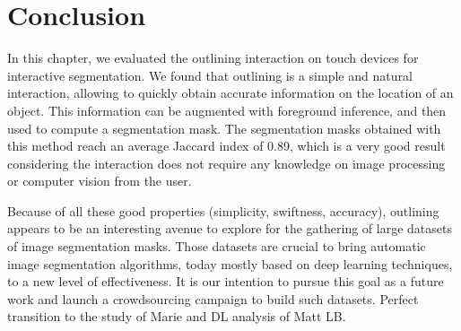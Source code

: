 \section{Conclusion}


In this chapter, we evaluated the outlining interaction
on touch devices for interactive segmentation.
We found that outlining is a simple and natural interaction, allowing
to quickly obtain accurate information on the location of an object.
This information can be augmented with foreground inference,
and then used to compute a segmentation mask.
The segmentation masks obtained with this method reach an average
Jaccard index of 0.89, which is a very good result
considering the interaction does not require any knowledge
on image processing or computer vision from the user.


Because of all these good properties (simplicity, swiftness, accuracy),
outlining appears to be an interesting avenue to explore for the gathering
of large datasets of image segmentation masks.
Those datasets are crucial to bring automatic image segmentation algorithms,
today mostly based on deep learning techniques, to a new level of effectiveness.
It is our intention to pursue this goal as a future work
and launch a crowdsourcing campaign to build such datasets.
\alert{Perfect transition to the study of Marie and DL analysis of Matt LB.}
